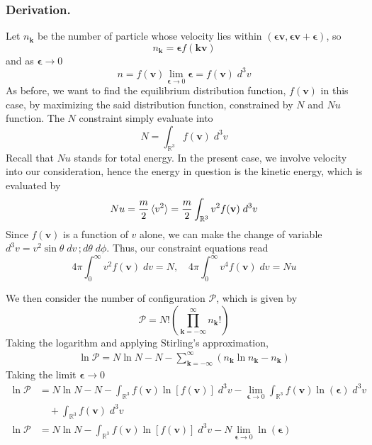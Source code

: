 \documentclass[../../../Main.tex]{subfiles}
\begin{document}
\subsubsection{Derivation.} Let $n_\mathbf{k}$ be the number of particle whose velocity lies within $(\boldsymbol{\epsilon}\mathbf{v},\boldsymbol{\epsilon}\mathbf{v}+\boldsymbol{\epsilon})$, so
\begin{equation*}
    n_\mathbf{k}=\boldsymbol{\epsilon}f(\mathbf{kv})
\end{equation*}
and as $\boldsymbol{\epsilon}\rightarrow0$
\begin{equation*}
    n=f(\mathbf{v})\lim_{\boldsymbol{\epsilon}\rightarrow0}\boldsymbol{\epsilon}=f(\mathbf{v})\;d^3v
\end{equation*}
As before, we want to find the equilibrium distribution function, $f(\mathbf{ v})$ in this case, by maximizing the said distribution function, constrained by $N$ and $Nu$ function. The $N$ constraint simply evaluate into 
\begin{equation*}
    N=\int_{\mathbb{R}^3}  f(\mathbf{v})\;d^3v
\end{equation*}
Recall that $Nu$ stands for total energy. In the present case, we involve velocity into our consideration, hence the energy in question is the kinetic energy, which is evaluated by
\begin{equation*}
    Nu=\frac{m}{2}\braket{v^2}=\frac{m}{2}\int_{\mathbb{R}^3} v^2f(\mathbf{v})\;d^3v
\end{equation*} 
Since $f(\mathbf{v})$ is a function of $v$ alone, we can make the change of variable $d^3v=v^2\sin\theta\;dv\,; d\theta\; d\phi$. Thus, our constraint equations read
\begin{equation*}
    4\pi\int_{0}^{\infty}v^2f(\mathbf{v})\;dv=N, \quad 4\pi \int_{0}^{\infty}v^4f(\mathbf{v})\;dv=Nu
\end{equation*}

We then consider the number of configuration $\mathcal{P}$, which is given by 
\begin{equation*}
    \mathcal{P}=N!\left(\prod_{\mathbf{k}=-\infty}^{\infty}n_\mathbf{k}!\right)
\end{equation*}
Taking the logarithm and applying Stirling's approximation,
\begin{align*}
    \ln \mathcal{P}=N\ln N-N-\sum_{\mathbf{k=-\infty}}^{\infty}\left(n_\mathbf{k}\ln n_\mathbf{k}-n_\mathbf{k} \right)
\end{align*}
Taking the limit $\boldsymbol{\epsilon}\rightarrow0$
\begin{align*}
    \ln \mathcal{P}&=N\ln N-N - \int_{\mathbb{R}^3}f(\mathbf{v})\ln [f(\mathbf{v})]\;d^3v - \lim_{\boldsymbol{\epsilon}\rightarrow0} \int_{\mathbb{R}^3}f(\mathbf{v})\ln (\boldsymbol{\epsilon})\;d^3v\\
    &\quad+\int_{\mathbb{R}^3}f(\mathbf{v})\;d^3v\\
    \ln \mathcal{P}&=N\ln N - \int_{\mathbb{R}^3}f(\mathbf{v})\ln [f(\mathbf{v})]\;d^3v -N\lim_{\boldsymbol{\epsilon}\rightarrow0}\ln (\boldsymbol{\epsilon})
\end{align*}
\end{document}
